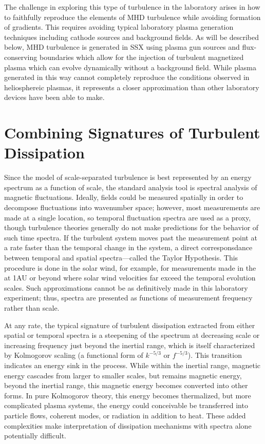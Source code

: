 \documentclass[aip,pop,amsmath,amssymb,reprint,superscriptaddress]{revtex4-1} %
\begin{document}
The challenge in exploring this type of turbulence in the laboratory arises in how to faithfully reproduce the elements of MHD turbulence while avoiding formation of gradients. This requires avoiding typical laboratory plasma generation techniques including cathode sources and background fields. As will be described below, MHD turbulence is generated in SSX using plasma gun sources and flux-conserving boundaries which allow for the injection of turbulent magnetized plasma which can evolve dynamically without a background field. While plasma generated in this way cannot completely reproduce the conditions observed in heliosphereic plasmas, it represents a closer approximation than other laboratory devices have been able to make.

\section{Combining Signatures of Turbulent Dissipation}

Since the model of scale-separated turbulence is best represented by an energy spectrum as a function of scale, the standard analysis tool is spectral analysis of magnetic fluctuations. Ideally, fields could be measured spatially in order to decompose fluctuations into wavenumber space; however, most measurements are made at a single location, so temporal fluctuation spectra are used as a proxy, though turbulence theories generally do not make predictions for the behavior of such time spectra. If the turbulent system moves past the measurement point at a rate faster than the temporal change in the system, a direct corresponsdance between temporal and spatial spectra---called the Taylor Hypothesis. This procedure is done in the solar wind, for example, for measurements made in the at 1AU or beyond where solar wind velocities far exceed the temporal evolution scales. Such approximations cannot be as definitively made in this laboratory experiment; thus, spectra are presented as functions of measurement frequency rather than scale.

At any rate, the typical signature of turbulent dissipation extracted from either spatial or temporal spectra is a steepening of the spectrum at decreasing scale or increasing frequency just beyond the inertial range, which is itself characterized by Kolmogorov scaling (a functional form of $k^{-5/3}$ or $f^{-5/3}$). This transition indicates an energy sink in the process. While within the inertial range, magnetic energy cascades from larger to smaller scales, but remains magnetic energy, beyond the inertial range, this magnetic energy becomes converted into other forms. In pure Kolmogorov theory, this energy becomes thermalized, but more complicated plasma systems, the energy could conceivable be transferred into particle flows, coherent modes, or radiation in addition to heat. These added complexities make interpretation of dissipation mechanisms with spectra alone potentially difficult. 
\end{document}
